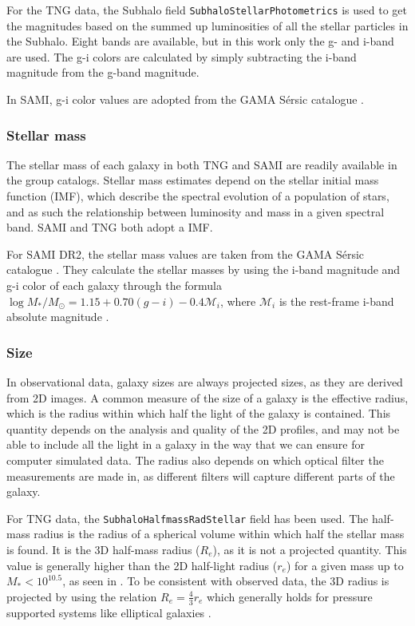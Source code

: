 For the TNG data, the Subhalo field \texttt{SubhaloStellarPhotometrics} is used to get the magnitudes based on the summed up luminosities of all the stellar particles in the Subhalo. Eight bands are available, but in this work only the g- and i-band are used. The g-i colors are calculated by simply subtracting the i-band magnitude from the g-band magnitude.

In SAMI, g-i color values are adopted from the GAMA Sérsic catalogue \parencite{Driver2011}.

\subsubsection{Stellar mass}
The stellar mass of each galaxy in both TNG and SAMI are readily available in the group catalogs. Stellar mass estimates depend on the stellar initial mass function (IMF), which describe the spectral evolution of a population of stars, and as such the relationship between luminosity and mass in a given spectral band. SAMI and TNG both adopt a \textcite{Chabrier2003} IMF.

For SAMI DR2, the stellar mass values are taken from the GAMA Sérsic catalogue \parencite{Driver2011}. They calculate the stellar masses by using the i-band magnitude and g-i color of each galaxy through the formula $\log M_*/M_\odot = 1.15 + 0.70(g-i) -0.4\mathcal{M}_i$, where $\mathcal{M}_i$ is the rest-frame i-band absolute magnitude \parencite{Taylor2011}.

\subsubsection{Size}\label{radius}
In observational data, galaxy sizes are always projected sizes, as they are derived from 2D images. A common measure of the size of a galaxy is the effective radius, which is the radius within which half the light of the galaxy is contained. This quantity depends on the analysis and quality of the 2D profiles, and may not be able to include all the light in a galaxy in the way that we can ensure for computer simulated data. The radius also depends on which optical filter the measurements are made in, as different filters will capture different parts of the galaxy.

For TNG data, the \texttt{SubhaloHalfmassRadStellar} field has been used. The half-mass radius is the radius of a spherical volume within which half the stellar mass is found. It is the 3D half-mass radius ($R_e$), as it is not a projected quantity. This value is generally higher than the 2D half-light radius ($r_e$) for a given mass up to $M_{*} < 10^{10.5}$, as seen in \textcite{Genel2017}. To be consistent with observed data, the 3D radius is projected by using the relation $R_{e} = \frac{4}{3}r_{e}$ which generally holds for pressure supported systems like elliptical galaxies \parencite{Wolf2010}.

